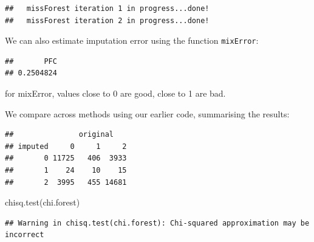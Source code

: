 \documentclass[
]{book}
\newenvironment{Shaded}{\begin{snugshade}}{\end{snugshade}}
\newcommand{\AttributeTok}[1]{\textcolor[rgb]{0.77,0.63,0.00}{#1}}
\newcommand{\FloatTok}[1]{\textcolor[rgb]{0.00,0.00,0.81}{#1}}
\newcommand{\FunctionTok}[1]{\textcolor[rgb]{0.00,0.00,0.00}{#1}}
\newcommand{\NormalTok}[1]{#1}
\newcommand{\OtherTok}[1]{\textcolor[rgb]{0.56,0.35,0.01}{#1}}
\newcommand{\SpecialCharTok}[1]{\textcolor[rgb]{0.00,0.00,0.00}{#1}}
\newcommand{\StringTok}[1]{\textcolor[rgb]{0.31,0.60,0.02}{#1}}
\begin{document}
\begin{verbatim}
##   missForest iteration 1 in progress...done!
##   missForest iteration 2 in progress...done!
\end{verbatim}

We can also estimate imputation error using the function \texttt{mixError}:

\begin{Shaded}
\end{Shaded}

\begin{verbatim}
##       PFC 
## 0.2504824
\end{verbatim}

for mixError, values close to 0 are good, close to 1 are bad.

We compare across methods using our earlier code, summarising the results:

\begin{Shaded}
\end{Shaded}

\begin{verbatim}
##               original
## imputed     0     1     2
##       0 11725   406  3933
##       1    24    10    15
##       2  3995   455 14681
\end{verbatim}

\begin{Shaded}
\begin{Highlighting}[]
\FunctionTok{chisq.test}\NormalTok{(chi.forest) }
\end{Highlighting}
\end{Shaded}

\begin{verbatim}
## Warning in chisq.test(chi.forest): Chi-squared approximation may be incorrect
\end{verbatim}
\end{document}
